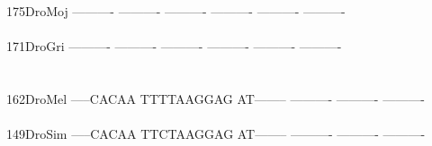 \documentclass[11pt,twoside,reqno,a4paper]{article}
\begin{document}
{175\hspace*{2\charwidth}DroMoj	----------	----------	----------	----------	----------	----------	\\
\hspace*{5\charwidth}\hspace*{7\charwidth}\hspace*{1\charwidth}\hspace*{1\charwidth}\hspace*{1\charwidth}\hspace*{1\charwidth}\hspace*{1\charwidth}\hspace*{1\charwidth}\\
171\hspace*{2\charwidth}DroGri	----------	----------	----------	----------	----------	----------	\\
\hspace*{5\charwidth}\hspace*{7\charwidth}\hspace*{1\charwidth}\hspace*{1\charwidth}\hspace*{1\charwidth}\hspace*{1\charwidth}\hspace*{1\charwidth}\hspace*{1\charwidth}\\
\\
162\hspace*{2\charwidth}DroMel	-----CACAA	TTTTAAGGAG	AT--------	----------	----------	----------	\\
\hspace*{5\charwidth}\hspace*{7\charwidth}\hspace*{1\charwidth}\hspace*{1\charwidth}\hspace*{1\charwidth}\hspace*{1\charwidth}\hspace*{1\charwidth}\hspace*{1\charwidth}\\
149\hspace*{2\charwidth}DroSim	-----CACAA	TTCTAAGGAG	AT--------	----------	----------	----------	\\
\hspace*{5\charwidth}\hspace*{7\charwidth}\hspace*{1\charwidth}\hspace*{1\charwidth}\hspace*{1\charwidth}\hspace*{1\charwidth}\hspace*{1\charwidth}\hspace*{1\charwidth}\\
}
\end{document}
